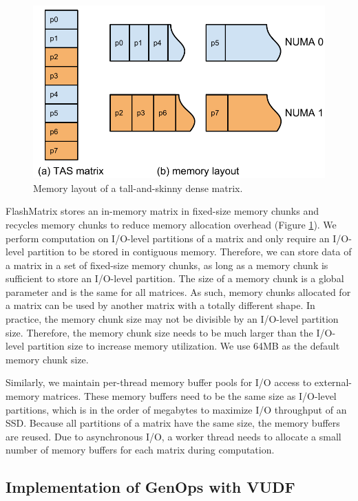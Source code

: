 \begin{figure}
	\centering
	\includegraphics[scale=0.5]{./matrix_mem.pdf}
	\caption{Memory layout of a tall-and-skinny dense matrix.}
	\label{fig:mat_mem}
\end{figure}

FlashMatrix stores an in-memory matrix in fixed-size memory chunks and
recycles memory chunks to reduce memory allocation overhead (Figure
\ref{fig:mat_mem}). We perform computation on I/O-level partitions of a matrix
and only require an I/O-level partition to be stored in contiguous memory.
Therefore, we can store data of a matrix in a set of fixed-size memory chunks,
as long as
a memory chunk is sufficient to store an I/O-level partition. The size of
a memory chunk is a global parameter and is the same for all matrices.
As such, memory chunks allocated for a matrix can be used by another matrix
with a totally different shape. In practice, the memory chunk size may
not be divisible by an I/O-level partition size. Therefore, the memory chunk
size needs to be much larger than the I/O-level partition size to increase
memory utilization. We use 64MB as the default memory chunk size.

Similarly, we maintain per-thread memory buffer pools for I/O access to
external-memory matrices. These memory buffers need to be the same size as
I/O-level partitions, which is in the order of megabytes to maximize I/O
throughput of an SSD. Because all partitions of a matrix have the same size,
the memory buffers are reused. Due to asynchronous I/O, a worker thread
needs to allocate a small number of memory buffers for each matrix during
computation.

\subsection{Implementation of GenOps with VUDF}

